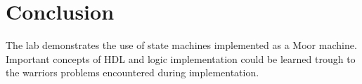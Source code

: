 \section{Conclusion}\label{sec: Conclusion}
The lab demonstrates the use of state machines implemented as a Moor machine. Important concepts of HDL and logic implementation could be learned trough to the warriors problems encountered during implementation.



